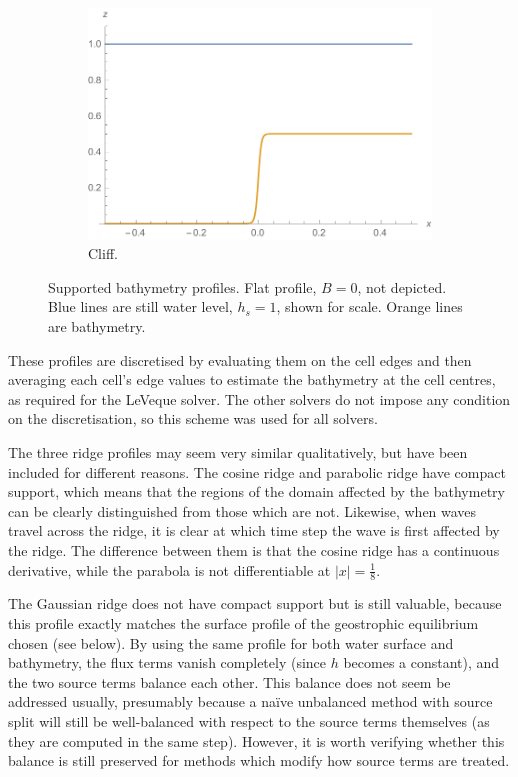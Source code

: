 \begin{figure}
\begin{subfigure}{0.45\textwidth}
    \includegraphics[width=\textwidth]{diagrams/bath-cliff}
    \caption{Cliff.}
    \label{fig:bath-cliff}
  \end{subfigure}
  \caption{Supported bathymetry profiles. Flat profile, $B = 0$, not depicted. Blue lines are still water level, $h_s = 1$, shown for scale. Orange lines are bathymetry.}
  \label{fig:bathymetries}
\end{figure}

These profiles are discretised by evaluating them on the cell edges and then averaging each cell's edge values to estimate the bathymetry at the cell centres, as required for the LeVeque solver. The other solvers do not impose any condition on the discretisation, so this scheme was used for all solvers.

The three ridge profiles may seem very similar qualitatively, but have been included for different reasons. The cosine ridge and parabolic ridge have compact support, which means that the regions of the domain affected by the bathymetry can be clearly distinguished from those which are not. Likewise, when waves travel across the ridge, it is clear at which time step the wave is first affected by the ridge. The difference between them is that the cosine ridge has a continuous derivative, while the parabola is not differentiable at $|x| = \frac{1}{8}$.

The Gaussian ridge does not have compact support but is still valuable, because this profile exactly matches the surface profile of the geostrophic equilibrium chosen (see below). By using the same profile for both water surface and bathymetry, the flux terms vanish completely (since $h$ becomes a constant), and the two source terms balance each other. This balance does not seem be addressed usually, presumably because a na\"ive unbalanced method with source split will still be well-balanced with respect to the source terms themselves (as they are computed in the same step). However, it is worth verifying whether this balance is still preserved for methods which modify how source terms are treated.

